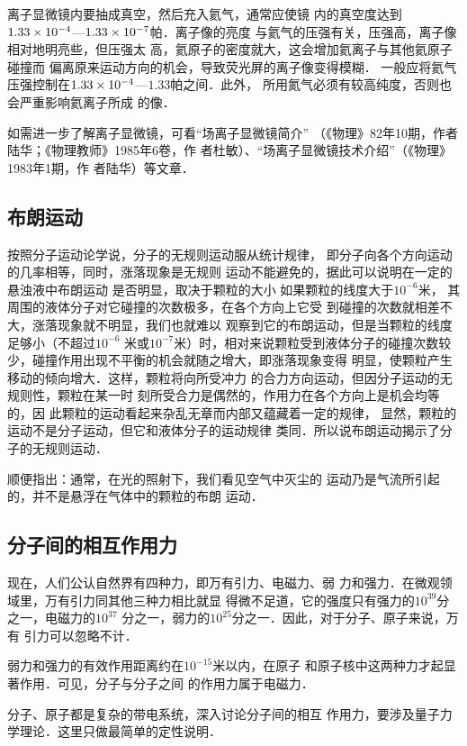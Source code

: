 离子显微镜内要抽成真空，然后充入氦气，通常应使镜
内的真空度达到$1.33\times10^{-4}$—$1.33\times10^{-7}$帕．离子像的亮度
与氦气的压强有关，压强高，离子像相对地明亮些，但压强太
高，氦原子的密度就大，这会增加氦离子与其他氦原子碰撞而
偏离原来运动方向的机会，导致荧光屏的离子像变得模糊．
一般应将氦气压强控制在$1.33\times10^{-4}$—$1.33$帕之间．此外，
所用氮气必须有较高纯度，否则也会严重影响氦离子所成
的像．

如需进一步了解离子显微镜，可看“场离子显微镜简介”
（《物理》82年10期，作者陆华；《物理教师》1985年6卷，作
者杜敏）、“场离子显微镜技术介绍”（《物理》1983年1期，作
者陆华）等文章．

\subsection{布朗运动}
按照分子运动论学说，分子的无规则运动服从统计规律，
即分子向各个方向运动的几率相等，同时，涨落现象是无规则
运动不能避免的，据此可以说明在一定的悬浊液中布朗运动
是否明显，取决于颗粒的大小 如果颗粒的线度大于$10^{-6}$米，
其周围的液体分子对它碰撞的次数极多，在各个方向上它受
到碰撞的次数就相差不大，涨落现象就不明显，我们也就难以
观察到它的布朗运动，但是当颗粒的线度足够小（不超过$10^{-6}$
米或$10^{-7}$米）时，相对来说颗粒受到液体分子的碰撞次数较
少，碰撞作用出现不平衡的机会就随之增大，即涨落现象变得
明显，使颗粒产生移动的倾向增大．这样，颗粒将向所受冲力
的合力方向运动，但因分子运动的无规则性，颗粒在某一时
刻所受合力是偶然的，作用力在各个方向上是机会均等的，因
此颗粒的运动看起来杂乱无章而内部又蕴藏着一定的规律，
显然，颗粒的运动不是分子运动，但它和液体分子的运动规律
类同．所以说布朗运动揭示了分子的无规则运动．

顺便指出：通常，在光的照射下，我们看见空气中灭尘的
运动乃是气流所引起的，并不是悬浮在气体中的颗粒的布朗
运动．

\subsection{分子间的相互作用力}
现在，人们公认自然界有四种力，即万有引力、电磁力、弱
力和强力．在微观领域里，万有引力同其他三种力相比就显
得微不足道，它的强度只有强力的$10^{39}$分之一，电磁力的$10^{37}$
分之一，弱力的$10^{25}$分之一．因此，对于分子、原子来说，万有
引力可以忽略不计．

弱力和强力的有效作用距离约在$10^{-15}$米以内，在原子
和原子核中这两种力才起显著作用．可见，分子与分子之间
的作用力属于电磁力．

分子、原子都是复杂的带电系统，深入讨论分子间的相互
作用力，要涉及量子力学理论．这里只做最简单的定性说明．


